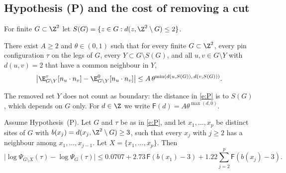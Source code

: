 \subsection{Hypothesis (P) and the cost of removing a cut}\label{s:P}

For finite $G \subset \Z^2$ let $S(G) = \{ z \in G : d(z, \Z^2 \setminus G) \le 2 \}$.

\begin{hypothesis}[P]\label{h:P}
There exist $A \ge 2$ and $\theta \in (0, 1)$ such that for every finite $G \subset \Z^2$, every pin configuration $\tau$ on the legs of $G$, every $Y \subset G \setminus S(G)$, and all $u, v \in G \setminus Y$ with $d(u, v) = 2$ that have a common neighbour in $Y$,
\begin{equation}\label{e:P}
\bigl| \E^\tau_{G \setminus Y}[n_u \cdot n_v] - \E^0_{G \setminus Y}[n_u \cdot n_v] \bigr| \le A \, \theta^{\min(d(u, S(G)), \, d(v, S(G)))} .
\end{equation}
\end{hypothesis}

The removed set $Y$ does not count as boundary: the distance in \eqref{e:P} is to $S(G)$, which depends on $G$ only. For $d \in \Z$ we write $\mathsf F(d) = A \theta^{\max(d, 0)}$.

\begin{lemma}\label{l:removal}
Assume Hypothesis~(P). Let $G$ and $\tau$ be as in \eqref{e:P}, and let $x_1, \dots, x_p$ be distinct sites of $G$ with $b(x_j) = d(x_j, \Z^2 \setminus G) \ge 3$, such that every $x_j$ with $j \ge 2$ has a neighbour among $x_1, \dots, x_{j - 1}$. Let $X = \{x_1, \dots, x_p\}$. Then
\begin{equation}\label{e:removal}
\bigl| \log \Psi_{G \setminus X}(\tau) - \log \Psi_G(\tau) \bigr| \le 0.0707 + 2.73 \, \mathsf F(b(x_1) - 3) + 1.22 \sum_{j = 2}^p \mathsf F(b(x_j) - 3) .
\end{equation}
\end{lemma}

